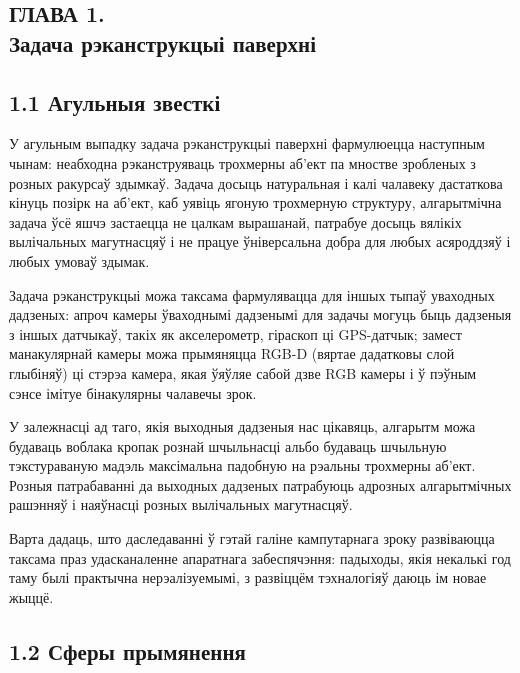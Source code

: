 \begin{center}
    \section*{ГЛАВА 1. \\ Задача рэканструкцыі паверхні}
\end{center}

\subsection*{1.1 Агульныя звесткі}

У агульным выпадку задача рэканструкцыі паверхні фармулюецца наступным чынам:
неабходна рэканструяваць трохмерны аб'ект па мностве зробленых з розных ракурсаў
здымкаў. Задача досыць натуральная і калі чалавеку дастаткова кінуць
позірк на аб'ект, каб уявіць ягоную трохмерную структуру, алгарытмічна задача
ўсё яшчэ застаецца не цалкам вырашанай, патрабуе досыць вялікіх вылічальных магутнасцяў
і не працуе ўніверсальна добра для любых асяроддзяў і любых умоваў здымак.

Задача рэканструкцыі можа таксама фармулявацца для іншых тыпаў уваходных дадзеных:
апроч камеры ўваходнымі дадзенымі для задачы могуць быць
дадзеныя з іншых датчыкаў, такіх як акселерометр, гіраскоп ці GPS-датчык;
замест манакулярнай камеры можа прымяняцца RGB-D (вяртае дадатковы слой глыбіняў)
ці стэрэа камера, якая ўяўляе сабой дзве RGB камеры
і ў пэўным сэнсе імітуе бінакулярны чалавечы зрок.

У залежнасці ад таго, якія выходныя дадзеныя нас цікавяць, алгарытм можа будаваць
воблака кропак рознай шчыльнасці альбо будаваць шчыльную тэкстураваную мадэль
максімальна падобную на рэальны трохмерны аб'ект. Розныя патрабаванні да выходных
дадзеных патрабуюць адрозных алгарытмічных рашэнняў і наяўнасці розных вылічальных магутнасцяў.

Варта дадаць, што даследаванні ў гэтай галіне кампутарнага зроку развіваюцца
таксама праз удасканаленне апаратнага забеспячэння: падыходы, якія некалькі год
таму былі практычна нерэалізуемымі, з развіццём тэхналогіяў даюць ім новае жыццё.

\subsection*{1.2 Сферы прымянення}

